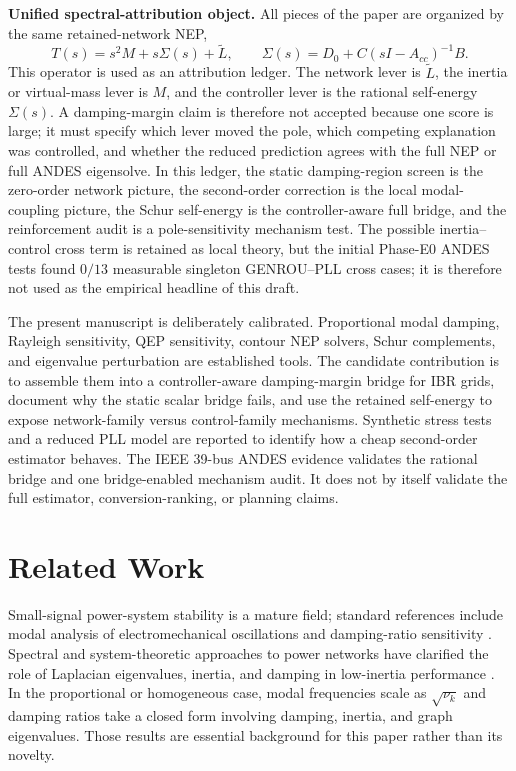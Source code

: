 \documentclass[journal]{IEEEtran}
\newcommand{\Lt}{\widetilde L}
\begin{document}
\noindent\textbf{Unified spectral-attribution object.}
All pieces of the paper are organized by the same retained-network NEP,
\begin{equation}
T(s)=s^2M+s\Sigma(s)+\Lt,\qquad
\Sigma(s)=D_0+C(sI-A_{cc})^{-1}B .
\label{eq:intro_unified_object}
\end{equation}
This operator is used as an attribution ledger. The network lever is $\Lt$, the inertia or virtual-mass lever is $M$, and the controller lever is the rational self-energy $\Sigma(s)$. A damping-margin claim is therefore not accepted because one score is large; it must specify which lever moved the pole, which competing explanation was controlled, and whether the reduced prediction agrees with the full NEP or full ANDES eigensolve. In this ledger, the static damping-region screen is the zero-order network picture, the second-order correction is the local modal-coupling picture, the Schur self-energy is the controller-aware full bridge, and the reinforcement audit is a pole-sensitivity mechanism test. The possible inertia--control cross term is retained as local theory, but the initial Phase-E0 ANDES tests found $0/13$ measurable singleton GENROU--PLL cross cases; it is therefore not used as the empirical headline of this draft.

The present manuscript is deliberately calibrated. Proportional modal damping, Rayleigh sensitivity, QEP sensitivity, contour NEP solvers, Schur complements, and eigenvalue perturbation are established tools. The candidate contribution is to assemble them into a controller-aware damping-margin bridge for IBR grids, document why the static scalar bridge fails, and use the retained self-energy to expose network-family versus control-family mechanisms. Synthetic stress tests and a reduced PLL model are reported to identify how a cheap second-order estimator behaves. The IEEE 39-bus ANDES evidence validates the rational bridge and one bridge-enabled mechanism audit. It does not by itself validate the full estimator, conversion-ranking, or planning claims.

\section{Related Work}

Small-signal power-system stability is a mature field; standard references include modal analysis of electromechanical oscillations and damping-ratio sensitivity \cite{kundur1994power,rogers2000oscillations}. Spectral and system-theoretic approaches to power networks have clarified the role of Laplacian eigenvalues, inertia, and damping in low-inertia performance \cite{pirani2017system,paganini2017global,pagnier2019optimal}. In the proportional or homogeneous case, modal frequencies scale as $\sqrt{\nu_k}$ and damping ratios take a closed form involving damping, inertia, and graph eigenvalues. Those results are essential background for this paper rather than its novelty.
\end{document}
